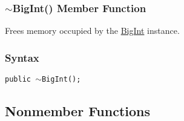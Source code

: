 \documentclass[a4paper,oneside,11.000000pt]{book}
\begin{document}
\hypertarget{System.Numerics.Multiprecision.BigInt.destructor.P.System.Numerics.Multiprecision.BigInt}{\subsubsection*{$\sim$BigInt() Member Function}}
\begin{flushleft}
Frees memory occupied by the \hyperlink{System.Numerics.Multiprecision.BigInt}{BigInt} instance.

\end{flushleft}
\subsubsection*{Syntax}\texttt{public $\sim$BigInt();}

\subsection{Nonmember Functions}
\end{document}
